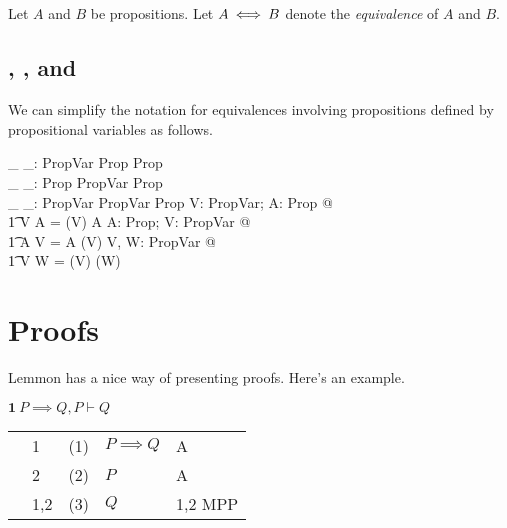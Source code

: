\documentclass[11pt, oneside]{article}
\begin{document}
\subsection{}

Let $A$ and $B$ be propositions.
Let $A \mathbin{\iff} B$ denote the {\it equivalence} of $A$ and $B$.

\subsection{, , and }

We can simplify the notation for equivalences involving propositions defined by propositional variables as follows.

\begin{axdef}
	\_ \equivPropVP \_: PropVar \cross Prop \inj Prop \\
	\_ \equivPropPV \_: Prop \cross PropVar \inj Prop \\
	\_ \equivPropVV \_: PropVar \cross PropVar \inj Prop
\where
	\forall V: PropVar; A: Prop @ \\
	\t1	V \equivPropVP A = (\varProp V) \equivProp A
\also
	\forall A: Prop; V: PropVar @ \\
	\t1	A \equivPropPV V = A \equivProp (\varProp V)
\also
	\forall V, W: PropVar @ \\
	\t1	V \equivPropVV W = (\varProp V) \equivProp (\varProp W)
\end{axdef}

\section{Proofs}

Lemmon has a nice way of presenting proofs.
Here's an example.

\vspace{1ex}

$\mathbf{1}\ P \implies Q, P \vdash Q$

\vspace{1ex}

\begin{tabular}{l l r l l}
&	1	&	(1)	&	$P \implies Q$	&	A \\
&	2	&	(2)	&	$P$			&	A \\
&	1,2	&	(3)	&	$Q$			&	1,2 MPP
\end{tabular}

\vspace{1ex}
\end{document}
